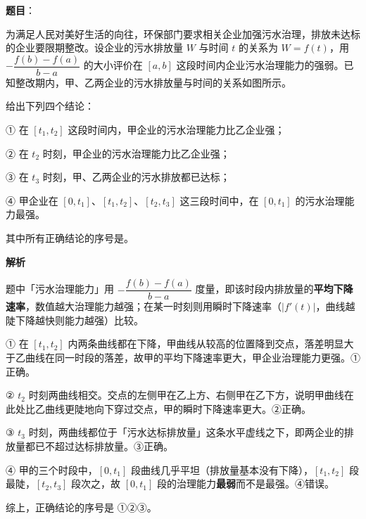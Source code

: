 \begin{answer}

\textbf{题目}：

为满足人民对美好生活的向往，环保部门要求相关企业加强污水治理，排放未达标的企业要限期整改。设企业的污水排放量 $W$ 与时间 $t$ 的关系为 $W=f(t)$，用 $-\dfrac{f(b)-f(a)}{b-a}$ 的大小评价在 $[a,b]$ 这段时间内企业污水治理能力的强弱。已知整改期内，甲、乙两企业的污水排放量与时间的关系如图所示。
\nopagebreak[4]
\begin{center}\end{center}
\nopagebreak[4]
给出下列四个结论：

① 在 $[t_1,t_2]$ 这段时间内，甲企业的污水治理能力比乙企业强；

② 在 $t_2$ 时刻，甲企业的污水治理能力比乙企业强；

③ 在 $t_3$ 时刻，甲、乙两企业的污水排放都已达标；

④ 甲企业在 $[0,t_1]$、$[t_1,t_2]$、$[t_2,t_3]$ 这三段时间中，在 $[0,t_1]$ 的污水治理能力最强。

其中所有正确结论的序号是\gkblank{}。

\textbf{解析}

题中「污水治理能力」用 $-\dfrac{f(b)-f(a)}{b-a}$ 度量，即该时段内排放量的\textbf{平均下降速率}，数值越大治理能力越强；在某一时刻则用瞬时下降速率（$|f'(t)|$，曲线越陡下降越快则能力越强）比较。

① 在 $[t_1,t_2]$ 内两条曲线都在下降，甲曲线从较高的位置降到交点，落差明显大于乙曲线在同一时段的落差，故甲的平均下降速率更大，甲企业治理能力更强。①正确。

② $t_2$ 时刻两曲线相交。交点的左侧甲在乙上方、右侧甲在乙下方，说明甲曲线在此处比乙曲线更陡地向下穿过交点，甲的瞬时下降速率更大。②正确。

③ $t_3$ 时刻，两曲线都位于「污水达标排放量」这条水平虚线之下，即两企业的排放量都已不超过达标排放量。③正确。

④ 甲的三个时段中，$[0,t_1]$ 段曲线几乎平坦（排放量基本没有下降），$[t_1,t_2]$ 段最陡，$[t_2,t_3]$ 段次之，故 $[0,t_1]$ 段的治理能力\textbf{最弱}而不是最强。④错误。

综上，正确结论的序号是 ①②③。


\end{answer}

